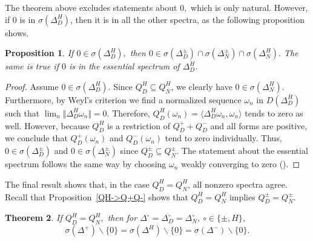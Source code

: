 \documentclass[10pt]{amsart}
\newtheorem{theorem}{Theorem}[section]
\newtheorem{proposition}[theorem]{Proposition}
\theoremstyle{definition}
\renewcommand{\bullet}{{\circ}}
\begin{document}
The theorem above excludes statements about $0,$ which is only natural. However, if $0$ is in $\sigma(\Delta^{H}_{D})$, then it is in all the other spectra, as the following proposition shows.

\begin{proposition}\label{spectrum2}  If $0\in\sigma(\Delta^H_{D}),$ then $0\in \sigma(\Delta^\pm_{D})\cap\sigma(\Delta^\pm_N)\cap \sigma(\Delta^{H}_{N}).$ The same is true if $0$ is in the essential spectrum of $\Delta^H_{D}.$
\end{proposition}
\begin{proof}
Assume  $0\in\sigma(\Delta^{H}_{D}) $. Since $Q^{H}_{D}\subseteq Q^{H}_{N}$, we clearly have $0\in\sigma(\Delta^{H}_{N}) $. 
	Furthermore, by Weyl's criterion we find a normalized sequence $\omega_n$ in $D(\Delta^H_{D})$ such that $\lim_n\Vert\Delta^H_{D}\omega_n\Vert = 0.$ Therefore, $Q^H_{D}(\omega_n) = \langle\Delta^H_D\omega_n,\omega_n\rangle$ tends to zero as well. However, because $Q^H_{D}$ is a restriction of $Q^+_{D}+Q^-_{D}$ and all forms are positive, we conclude that $Q^+_{D}(\omega_n)$ and $Q^-_{D}(\omega_n)$ tend to zero individually. 
	Thus, $0\in \sigma(\Delta^\pm_{D})$ and $0\in \sigma(\Delta^\pm_N)$ since $Q^{\pm}_{D}\subseteq Q^{\pm}_{N}$.
	The statement about the essential spectrum follows  the same way by choosing $\omega_n$ weakly converging to zero (\cite[Theorem~E.4]{KLW}).
\end{proof}



The final result shows that, in the case $Q^H_{D} = Q^H_N$, all nonzero spectra agree. Recall that Proposition~\ref{QH->Q+Q-} shows that $Q^H_{D} = Q^H_N$ implies $Q^\pm_{D} = Q^\pm_N$.


\begin{theorem}\label{spectrum1}  If $Q^H_{D} = Q^H_N,$ then for $\Delta^{\bullet}=\Delta^{\bullet}_{D}=\Delta_{N}^{\bullet}$, $\bullet\in\{\pm,H\}$, $$\sigma(\Delta^+)\backslash\lbrace 0\rbrace=\sigma(\Delta^H)\backslash\lbrace 0\rbrace = \sigma(\Delta^-)\backslash\lbrace 0\rbrace.$$
\end{theorem}
\end{document}

